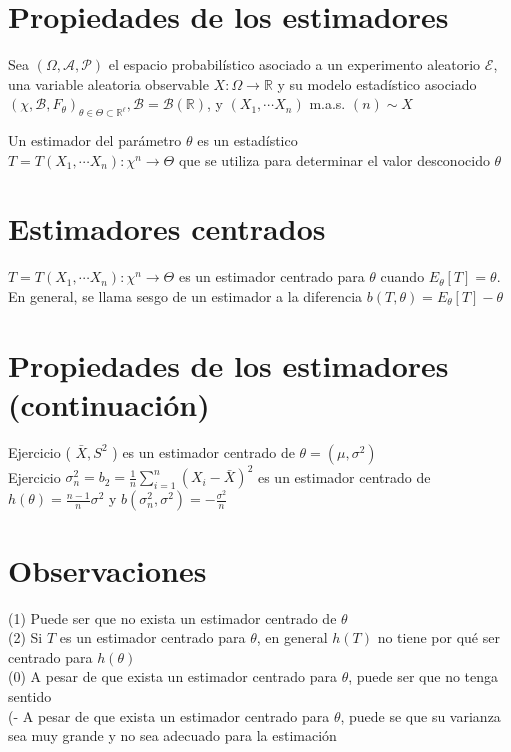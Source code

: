 \section*{Propiedades de los estimadores}
Sea $(\Omega, \mathcal{A}, \mathcal{P})$ el espacio probabilístico asociado a un experimento aleatorio $\mathcal{E}$, una variable aleatoria observable $X: \Omega \longrightarrow \mathbb{R}$ y su modelo estadístico asociado $\left(\chi, \mathcal{B}, F_{\theta}\right)_{\theta \in \Theta \subset \mathbb{R}^{\ell}}, \mathcal{B}=\mathcal{B}(\mathbb{R})$, y $\left(X_{1}, \cdots X_{n}\right)$ m.a.s. $(n) \sim X$

Un estimador del parámetro $\theta$ es un estadístico\\
$T=T\left(X_{1}, \cdots X_{n}\right): \chi^{n} \longrightarrow \Theta$ que se utiliza para determinar el valor desconocido $\theta$

\section*{Estimadores centrados}
$T=T\left(X_{1}, \cdots X_{n}\right): \chi^{n} \longrightarrow \Theta$ es un estimador centrado para $\theta$ cuando $E_{\theta}[T]=\theta$. En general, se llama sesgo de un estimador a la diferencia $b(T, \theta)=E_{\theta}[T]-\theta$

\section*{Propiedades de los estimadores (continuación)}
Ejercicio ( $\bar{X}, S^{2}$ ) es un estimador centrado de $\theta=\left(\mu, \sigma^{2}\right)$\\
Ejercicio $\sigma_{n}^{2}=b_{2}=\frac{1}{n} \sum_{i=1}^{n}\left(X_{i}-\bar{X}\right)^{2}$ es un estimador centrado de $h(\theta)=\frac{n-1}{n} \sigma^{2}$ y $b\left(\sigma_{n}^{2}, \sigma^{2}\right)=-\frac{\sigma^{2}}{n}$

\section*{Observaciones}
(1) Puede ser que no exista un estimador centrado de $\theta$\\
(2) Si $T$ es un estimador centrado para $\theta$, en general $h(T)$ no tiene por qué ser centrado para $h(\theta)$\\
(0) A pesar de que exista un estimador centrado para $\theta$, puede ser que no tenga sentido\\
(- A pesar de que exista un estimador centrado para $\theta$, puede se que su varianza sea muy grande y no sea adecuado para la estimación


